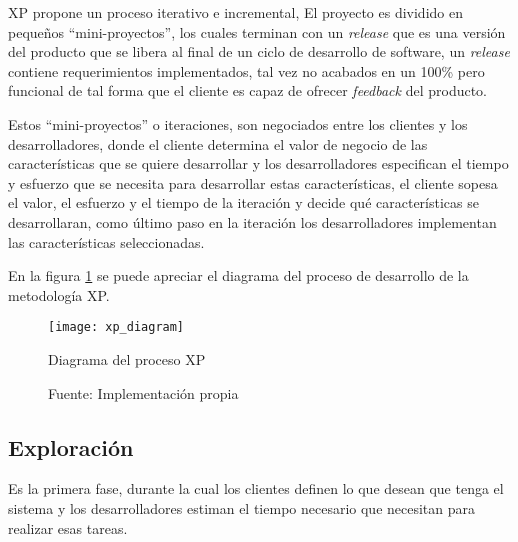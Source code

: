        XP propone un proceso iterativo e incremental, El proyecto es dividido en pequeños “mini-proyectos”, los cuales terminan con un \emph{release} que es una versión del producto que se libera al final de un ciclo de desarrollo de software, un \emph{release} contiene requerimientos implementados, tal vez no acabados en un  100\% pero funcional de tal forma que el cliente es capaz de ofrecer \emph{feedback} del producto. \cite{xp_overview}

       Estos ``mini-proyectos'' o iteraciones, son negociados entre los clientes y los desarrolladores, donde el cliente determina el valor de negocio de las características que se quiere desarrollar y los desarrolladores especifican el tiempo y esfuerzo que se necesita para desarrollar estas características, el cliente sopesa el valor, el esfuerzo y el tiempo de la iteración y decide qué características se desarrollaran, como último paso en la iteración los desarrolladores implementan las características seleccionadas.


           En la figura \ref{fig:xp_diagram} se puede apreciar el diagrama del proceso de desarrollo de la metodología XP.


     \begin{figure}[!ht]
       \begin{center}
         \texttt{[image: xp\_diagram]}
         \caption{Diagrama del proceso XP}
         \label{fig:xp_diagram}
         \caption*{Fuente: Implementación propia}
       \end{center}
     \end{figure}



       \subsection{Exploración}
       \label{sub:Exploracion}

       Es la primera fase, durante la cual los clientes definen lo que desean que tenga el sistema y los desarrolladores estiman el tiempo necesario que necesitan para realizar esas tareas.

